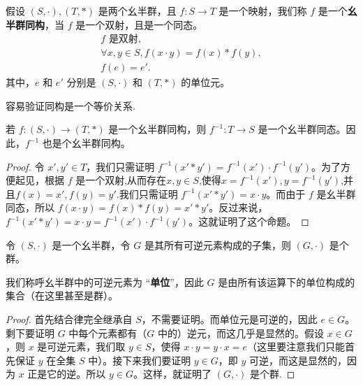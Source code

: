 \documentclass[../../main.tex]{subfiles}
\begin{document}
\begin{definition}[幺半群同构]
假设 $(S, \cdot), (T, *)$ 是两个幺半群，且 $f : S \to T$ 是一个映射，我们称 $f$ 是一个\textbf{幺半群同构}，当 $f$ 是一个双射，且是一个同态。
\begin{gather*}
f \text{ 是双射} ,\\
\forall x, y \in S, f(x \cdot y) = f(x) * f(y) ,\\
f(e) = e' .
\end{gather*}
其中，$e$ 和 $e'$ 分别是 $(S, \cdot)$ 和 $(T, *)$ 的单位元。 
\end{definition}
\begin{remark}
容易验证同构是一个等价关系.
\end{remark}

\begin{proposition}[幺半群同构的逆是幺半群同态]\label{proposition:幺半群同构的逆是幺半群同态}
若 $f : (S, \cdot) \to (T, *)$ 是一个幺半群同构，则 $f^{-1} : T \to S$ 是一个幺半群同态。因此，$f^{-1}$ 也是个幺半群同构。
\end{proposition}
\begin{proof}
令 $x', y' \in T$，我们只需证明 $f^{-1}(x' * y') = f^{-1}(x') \cdot f^{-1}(y')$。为了方便起见，根据 $f$ 是一个双射,从而存在$x,y\in S$,使得$x = f^{-1}(x'), y = f^{-1}(y')$,并且$f(x)=x',f(y)=y'$.我们只需证明 $f^{-1}(x' * y') = x \cdot y$。而由于 $f$ 是幺半群同态，所以 $f(x \cdot y) = f(x) * f(y) = x' * y'$。反过来说，$f^{-1}(x' * y') = x \cdot y = f^{-1}(x') \cdot f^{-1}(y')$。这就证明了这个命题。 

\end{proof}


\begin{lemma}\label{lemma:幺半群中所有可逆元构成了群}
令 $(S, \cdot)$ 是一个幺半群，令 $G$ 是其所有可逆元素构成的子集，则 $(G, \cdot)$ 是个群。
\end{lemma}
\begin{remark}
我们称呼幺半群中的可逆元素为 “\textbf{单位}”，因此 $G$ 是由所有该运算下的单位构成的集合（在这里甚至是群）。
\end{remark}
\begin{proof}
首先结合律完全继承自 $S$，不需要证明。而单位元是可逆的，因此 $e \in G$。剩下要证明 $G$ 中每个元素都有（$G$ 中的）逆元，而这几乎是显然的。假设 $x \in G$，则 $x$ 是可逆元素，我们取 $y \in S$，使得 $x \cdot y = y \cdot x = e$（这里要注意我们只能首先保证 $y$ 在全集 $S$ 中）。接下来我们要证明 $y \in G$，即 $y$ 可逆，而这是显然的，因为 $x$ 正是它的逆。所以 $y \in G$。这样，就证明了 $(G, \cdot)$ 是个群.

\end{proof}
\end{document}
